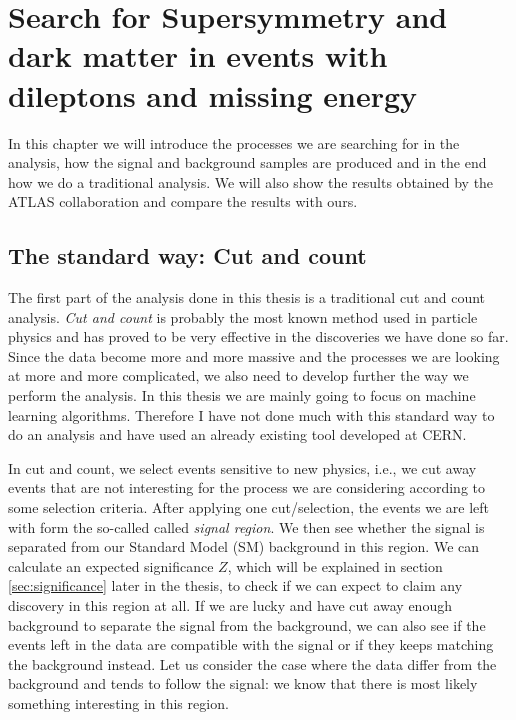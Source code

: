 \chapter{Search for Supersymmetry and dark matter in events with dileptons and missing energy}
\label{sec:CandCanalysis}


In this chapter we will introduce the processes we are searching for in the analysis, how the signal and background samples are produced and in the end how we do a traditional analysis. We will also show the results obtained by the ATLAS collaboration and compare the results with ours. 




\section{The standard way: Cut and count}
\label{sec:candc}

The first part of the analysis done in this thesis is a traditional cut and count analysis. \textit{Cut and count} is probably the most known method used in particle physics and has proved to be very effective in the discoveries we have done so far. Since the data become more and more massive and the processes we are looking at more and more complicated, we also need to develop further the way we perform the analysis. In this thesis we are mainly going to focus on machine learning algorithms. Therefore I have not done much with this standard way to do an analysis and have used an already existing tool developed at CERN.  

In cut and count, we select events sensitive to new physics, i.e., we cut away events that are not interesting for the process we are considering according to some selection criteria. After applying one cut/selection, the events we are left with form the so-called called \textit{signal region}. We then see whether the signal is separated from our Standard Model (SM) background in this region. We can calculate an expected significance $Z$, which will be explained in section \ref{sec:significance} later in the thesis, to check if we can expect to claim any discovery in this region at all. If we are lucky and have cut away enough background to separate the signal from the background, we can also see if the events left in the data are compatible with the signal or if they keeps matching the background instead. Let us consider the case where the data differ from the background and tends to follow the signal: we know that there is most likely something interesting in this region.

